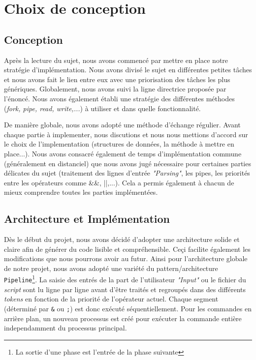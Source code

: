 \documentclass[12pt]{article}
\begin{document}


\section{Choix de conception} 

\subsection{Conception}
Après la lecture du sujet, nous avons commencé par mettre en place notre stratégie d'implémentation. Nous avons divisé le sujet en différentes petites tâches et nous avons fait le lien entre eux avec une priorisation des tâches les plus génériques. Globalement, nous avons suivi la ligne directrice proposée par l'énoncé. Nous avons également établi une stratégie des différentes méthodes (\textit{fork, pipe, read, write,...}) à utiliser et dans quelle fonctionnalité.

De manière globale, nous avons adopté une méthode d'échange régulier. Avant chaque partie à implementer, nous discutions et nous nous mettions d'accord sur le choix de l'implementation (structures de données, la méthode à mettre en place...). Nous avons consacré également de temps d'implémentation commune (généralement en distanciel) que nous avons jugé nécessaire pour certaines parties délicates du sujet (traitement des lignes d'entrée \textit{"Parsing"}, les pipes, les priorités entre les opérateurs comme \&\&, ||,...). Cela a permis également à chacun de mieux comprendre toutes les parties implémentées.

\subsection{Architecture et Implémentation}
Dès le début du projet, nous avons décidé d'adopter une architecture solide et claire afin de générer du code lisible et compréhensible. Ceçi facilite également les modifications que nous pourrons avoir au futur. 
Ainsi pour l'architecture globale de notre projet, nous avons adopté une variété du pattern/architecture \texttt{Pipeline}\footnote{La sortie d'une phase est l'entrée de la phase suivante}. La saisie des entrés de la part de l'utilisateur \textit{"Input"} ou le fichier du \textit{script} sont lu ligne par ligne avant d'être traités et regroupés dans des différents \textit{tokens} en fonction de la priorité de l'opérateur actuel.
Chaque segment (déterminé par \texttt{\&} ou \texttt{;}) est donc exécuté séquentiellement. Pour les commandes en arrière plan, un nouveau processus est créé pour exécuter la commande entière independamment du processus principal.
\end{document}
